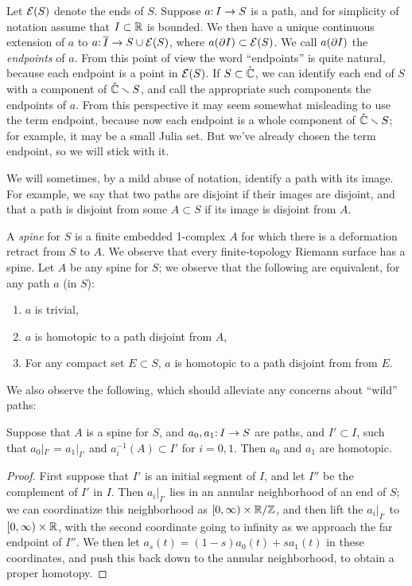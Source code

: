 Let ${\mathcal E}(S)$ denote the ends of $S$. 
Suppose $a \mathpunct: I \to S$ is a path, and for simplicity of notation assume that $I \subset {\Bbb R}$ is bounded. 
We then have a unique continuous extension of $a$ to $a\mathpunct: \overline{I} \to S \cup {\mathcal E}(S)$, 
where $a(\partial I) \subset {\mathcal E}(S)$. 
We call $a(\partial I)$ the \emph{endpoints} of $a$. 
From this point of view the word ``endpoints'' is quite natural, 
because each endpoint is a point in ${\mathcal E}(S)$. 
If $S \subset \hat {{\Bbb C}}$,
we can identify each end of $S$ with a component of $\hat {{\Bbb C}} \smallsetminus S$,
and call the appropriate such components the endpoints of $a$. 
From this perspective it may seem somewhat misleading to use the term endpoint, because now each endpoint is a whole component of $\hat {{\Bbb C}} \smallsetminus S$; for example, it may be a small Julia set.
But we've already chosen the term endpoint, so we will stick with it. 

We will sometimes, by a mild abuse of notation, identify a path with its image.
For example,
we say that two paths are disjoint if their images are disjoint, and that a path is disjoint from some $A \subset S$ if its image is disjoint from $A$.

A \emph{spine} for $S$ is a finite embedded 1-complex $A$ for which there is a deformation retract from $S$ to $A$.
We observe that every finite-topology Riemann surface has a spine.
Let $A$ be any spine for $S$; we observe that the following are equivalent,
for any path $a$ (in $S$):
\begin{enumerate}
\item
$a$ is trivial,
\item
$a$ is homotopic to a path disjoint from $A$,
\item
For any compact set $E \subset S$,
$a$ is homotopic to a path disjoint from from $E$.
\end{enumerate}

We also observe the following, which should alleviate any concerns about ``wild'' paths:
\begin{lemma} \label{lem:un-wild}
Suppose that $A$ is a spine for $S$, and $a_0, a_1\mathpunct: I \to S$ are paths,
and $I' \subset I$, such that $a_0|_{I'} = a_1|_{I'}$ and $a_i^{-1}(A) \subset I'$ for $i = 0, 1$.
Then $a_0$ and $a_1$ are homotopic.
\end{lemma}
\begin{proof}
First suppose that $I'$ is an initial segment of $I$, and let $I''$ be the complement of $I'$ in $I$.
Then $a_i|_{I'}$ lies in an annular neighborhood of an end of $S$;
we can coordinatize this neighborhood as $[0, \infty) \times {\Bbb R}/{\Bbb Z}$,
and then lift the $a_i|_{I'}$ to $[0, \infty) \times {\Bbb R}$, with the second coordinate going to infinity as we approach the far endpoint of $I''$.
We then let $a_s(t) = (1-s) a_0(t) + s a_1(t)$ in these coordinates,
and push this back down to the annular neighborhood, to obtain a proper homotopy. 
\end{proof}

